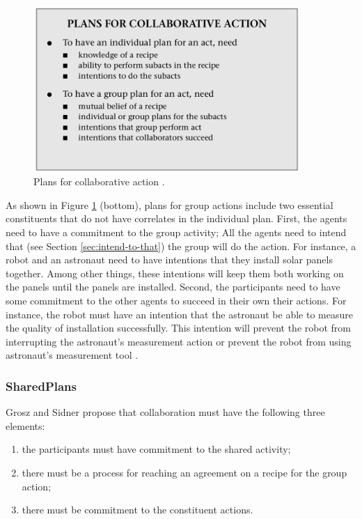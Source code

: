 \documentclass[11pt]{article}
\begin{document}
\begin{figure}[tbh]
  \center
  \includegraphics[width=0.9\textwidth]{figure/plans.png}
  \caption{Plans for collaborative action \cite{grosz:collaborative-systems}.}
  \label{fig:plans}
\end{figure}

As shown in Figure \ref{fig:plans} (bottom), plans for group actions include two
essential constituents that do not have correlates in the individual plan.
First, the agents need to have a commitment to the group activity; All the
agents need to intend that (see Section \ref{sec:intend-to-that}) the group will
do the action. For instance, a robot and an astronaut need to have intentions
that they install solar panels together. Among other things, these intentions
will keep them both working on the panels until the panels are installed.
Second, the participants need to have some commitment to the other agents to
succeed in their own their actions. For instance, the robot must have an
intention that the astronaut be able to measure the quality of installation
successfully. This intention will prevent the robot from interrupting the
astronaut's measurement action or prevent the robot from using astronaut's
measurement tool \cite{grosz:collaborative-systems, grosz:plans-discourse}.

\subsubsection{SharedPlans}

Grosz and Sidner propose that collaboration must have the following three
elements:

\begin{enumerate}
  \item the participants must have commitment to the shared activity;
  \item there must be a process for reaching an agreement on a recipe for the
  group action;
  \item there must be commitment to the constituent actions. 
\end{enumerate}
\end{document}
